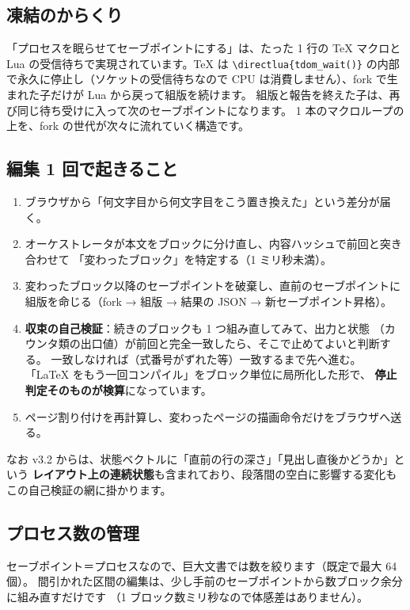 \documentclass[11pt,a4paper]{ltjsarticle}
\newcommand{\code}[1]{\texttt{#1}}
\newcommand{\cs}[1]{\texttt{\textbackslash #1}}
\begin{document}
\subsection{凍結のからくり}

「プロセスを眠らせてセーブポイントにする」は、たった 1 行の TeX マクロと
Lua の受信待ちで実現されています。TeX は
\cs{directlua}\code{\{tdom\_wait()\}} の内部で永久に停止し（ソケットの受信待ちなので
CPU は消費しません）、fork で生まれた子だけが Lua から戻って組版を続けます。
組版と報告を終えた子は、再び同じ待ち受けに入って次のセーブポイントになります。
1 本のマクロループの上を、fork の世代が次々に流れていく構造です。

\subsection{編集 1 回で起きること}

\begin{enumerate}
\item ブラウザから「何文字目から何文字目をこう置き換えた」という差分が届く。
\item オーケストレータが本文をブロックに分け直し、内容ハッシュで前回と突き合わせて
  「変わったブロック」を特定する（1 ミリ秒未満）。
\item 変わったブロック以降のセーブポイントを破棄し、直前のセーブポイントに
  組版を命じる（fork → 組版 → 結果の JSON → 新セーブポイント昇格）。
\item \textbf{収束の自己検証}：続きのブロックも 1 つ組み直してみて、出力と状態
  （カウンタ類の出口値）が前回と完全一致したら、そこで止めてよいと判断する。
  一致しなければ（式番号がずれた等）一致するまで先へ進む。
  「LaTeX をもう一回コンパイル」をブロック単位に局所化した形で、
  \textbf{停止判定そのものが検算}になっています。
\item ページ割り付けを再計算し、変わったページの描画命令だけをブラウザへ送る。
\end{enumerate}

なお v3.2 からは、状態ベクトルに「直前の行の深さ」「見出し直後かどうか」という
\textbf{レイアウト上の連続状態}も含まれており、段落間の空白に影響する変化も
この自己検証の網に掛かります。

\subsection{プロセス数の管理}

セーブポイント＝プロセスなので、巨大文書では数を絞ります（既定で最大 64 個）。
間引かれた区間の編集は、少し手前のセーブポイントから数ブロック余分に組み直すだけです
（1 ブロック数ミリ秒なので体感差はありません）。
\end{document}
